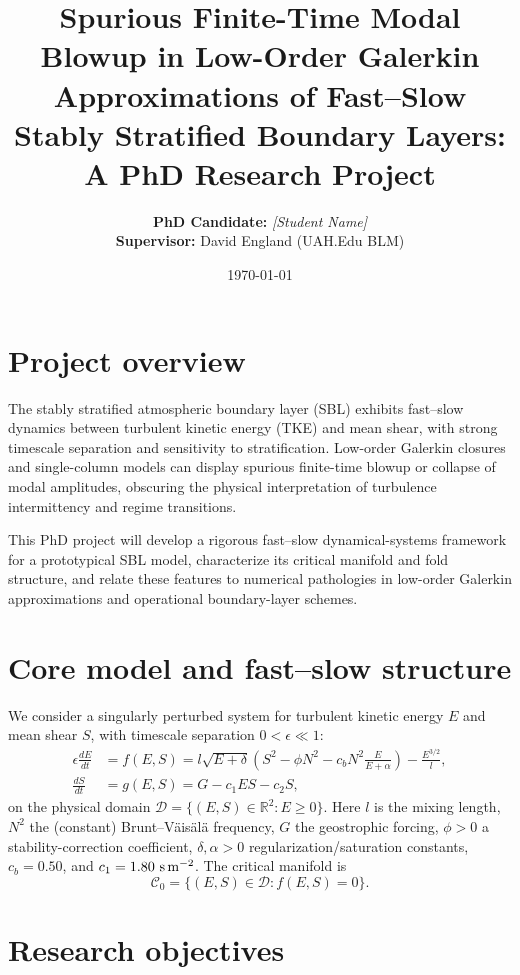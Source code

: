 \documentclass[11pt,fleqn]{article}
\title{\textbf{Spurious Finite-Time Modal Blowup in Low-Order Galerkin Approximations of Fast--Slow Stably Stratified Boundary Layers:}\\
A PhD Research Project}
\author{\textbf{PhD Candidate:} \textit{[Student Name]} \\ \textbf{Supervisor:} David England (UAH.Edu BLM)}
\date{\today}
\begin{document}
\maketitle

\section{Project overview}

The stably stratified atmospheric boundary layer (SBL) exhibits fast--slow dynamics
between turbulent kinetic energy (TKE) and mean shear, with strong timescale
separation and sensitivity to stratification. Low-order Galerkin closures and
single-column models can display spurious finite-time blowup or collapse of
modal amplitudes, obscuring the physical interpretation of turbulence
intermittency and regime transitions.

This PhD project will develop a rigorous fast--slow dynamical-systems framework
for a prototypical SBL model, characterize its critical manifold and fold
structure, and relate these features to numerical pathologies in low-order
Galerkin approximations and operational boundary-layer schemes.

\section{Core model and fast--slow structure}

We consider a singularly perturbed system for turbulent kinetic energy $E$ and
mean shear $S$, with timescale separation $0 < \epsilon \ll 1$:
\begin{align}
\epsilon \frac{dE}{dt} &= f(E,S) = l \sqrt{E + \delta} \left( S^2 - \phi N^2 - c_b N^2 \frac{E}{E + \alpha} \right) - \frac{E^{3/2}}{l}, \label{eq:fast_tke} \\
\frac{dS}{dt} &= g(E,S) = G - c_1 E S - c_2 S, \label{eq:slow_shear}
\end{align}
on the physical domain $\mathcal{D} = \{(E,S) \in \mathbb{R}^2 : E \ge 0\}$.
Here $l$ is the mixing length, $N^2$ the (constant) Brunt--Väisälä frequency,
$G$ the geostrophic forcing, $\phi > 0$ a stability-correction coefficient,
$\delta, \alpha > 0$ regularization/saturation constants, $c_b = 0.50$, and
$c_1 = 1.80\ \text{s\,m}^{-2}$. The critical manifold is
\begin{equation}
\mathcal{C}_0 = \{(E,S) \in \mathcal{D} : f(E,S) = 0\}.
\end{equation}

\section{Research objectives}
\end{document}
